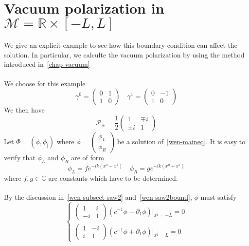 \section{Vacuum polarization in $\mathcal{M} = \mathbb R \times [-L, L]$ }
We give an explicit example to see how this boundary condition can affect the solution. 
In particular, we calculte the vacuum polarization by using the method introduced in~\cref{chap-vacuum}\\\\
We choose for this example
\begin{equation*}
\gamma^0 = \begin{pmatrix} 0 & 1 \\ 1 & 0 \end{pmatrix} \quad
\gamma^1 = \begin{pmatrix} 0 & -1 \\ 1 & 0 \end{pmatrix}
\end{equation*}
We then have 
\begin{equation*}
 \mathcal{P}_\pm = \frac 1 2  \begin{pmatrix} 1 & \mp i \\ \pm i & 1 \end{pmatrix}
\end{equation*}
Let $\Phi = (\phi, \phi_|)$ where $\phi = \begin{pmatrix} \phi_L \\ \phi_R \end{pmatrix}$ be a solution of~\cref{wen-maineq}. 
It is easy to verify that $\phi_L$ and $\phi_R$ are of form
\begin{equation*}
\phi_L = f e^{-ik(x^0 - x^1)} \quad
\phi_R = g e^{-ik(x^0 + x^1)}
\end{equation*}
where $f, g\in\mathbb C$ are constants which have to be determined. \\\\
By the discussion in~\cref{wen-subsect-saw2} and~\cref{wen-saw2bound}, $\phi$ must satisfy
\begin{equation*}
\begin{cases}
\begin{pmatrix} 1 & i \\ -i & 1 \end{pmatrix}(c^{-1} \phi - \partial_1 \phi)\vert_{x^1 = -L} = 0 \\
%
\begin{pmatrix} 1 & -i \\ i & 1 \end{pmatrix}(c^{-1} \phi + \partial_1 \phi)\vert_{x^1 = L} = 0
\end{cases}
\end{equation*}
